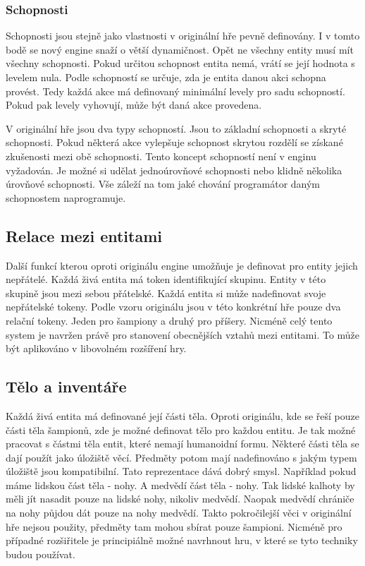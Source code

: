  \subsubsection{Schopnosti}
 Schopnosti jsou stejně jako vlastnosti v originální hře pevně definovány. I v tomto bodě se nový engine snaží o větší
 dynamičnost. Opět ne všechny entity musí mít všechny schopnosti. Pokud určitou schopnost entita nemá, vrátí se její hodnota s levelem nula.
 Podle schopností se určuje, zda je entita danou akci schopna provést. Tedy každá akce má definovaný minimální levely pro sadu schopností.
 Pokud pak levely vyhovují, může být daná akce provedena.

 V originální hře jsou dva typy schopností. Jsou to základní schopnosti a skryté schopnosti. Pokud některá akce vylepšuje schopnost skrytou
 rozdělí se získané zkušenosti mezi obě schopnosti. Tento koncept schopností není v enginu vyžadován. Je možné si udělat jednoúrovňové 
 schopnosti nebo klidně několika úrovňové schopnosti. Vše záleží na tom jaké chování programátor daným schopnostem naprogramuje. 

 \subsection{Relace mezi entitami}
 Další funkcí kterou oproti originálu engine umožňuje je definovat pro entity jejich nepřátelé. Každá živá entita má token identifikující
 skupinu. Entity v této skupině jsou mezi sebou přátelské. Každá entita si může nadefinovat svoje nepřátelské tokeny.
 Podle vzoru originálu jsou v této konkrétní hře pouze dva relační tokeny. Jeden pro šampiony a druhý pro příšery. Nicméně
 celý tento system je navržen právě pro stanovení obecnějších vztahů mezi entitami. To může být aplikováno v libovolném rozšíření hry.
 
\subsection{Tělo a inventáře}
Každá živá entita má definované její části těla. Oproti originálu, kde se řeší pouze části těla šampionů,
zde je možné definovat tělo pro každou entitu. Je tak možné pracovat s částmi těla entit, které nemají humanoidní formu.
Některé části těla se dají použít jako úložiště věcí. Předměty potom mají nadefinováno s jakým typem úložiště jsou kompatibilní.
Tato reprezentace dává dobrý smysl. Například pokud máme lidskou část těla - nohy. A medvědí část těla - nohy. Tak lidské
kalhoty by měli jít nasadit pouze na lidské nohy, nikoliv medvědí. Naopak medvědí chrániče na nohy půjdou dát pouze na
nohy medvědí. Takto pokročilejší věci v originální hře nejsou použity, předměty tam mohou sbírat pouze šampioni. Nicméně
pro případné rozšiřitele je principiálně možné navrhnout hru, v které se tyto techniky budou používat.

